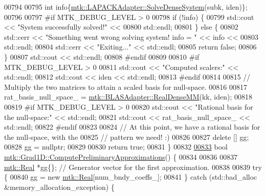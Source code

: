 \begin{DoxyCode}
{{00794 
00795   \textcolor{keywordtype}{int} info\{\hyperlink{classmtk_1_1LAPACKAdapter_a7428bccf74fd4a4af68fb7233846da22}{mtk::LAPACKAdapter::SolveDenseSystem}(subk, iden)\};
00796 
00797 \textcolor{preprocessor}{  #if MTK\_DEBUG\_LEVEL > 0}
00798   \textcolor{keywordflow}{if} (!info) \{
00799     std::cout << \textcolor{stringliteral}{"System successfully solved!"} <<
00800       std::endl;
00801   \} \textcolor{keywordflow}{else} \{
00802     std::cerr << \textcolor{stringliteral}{"Something went wrong solving system! info = "} << info <<
00803       std::endl;
00804     std::cerr << \textcolor{stringliteral}{"Exiting..."} << std::endl;
00805     \textcolor{keywordflow}{return} \textcolor{keyword}{false};
00806   \}
00807   std::cout << std::endl;
00808 \textcolor{preprocessor}{  #endif}
00809 
00810 \textcolor{preprocessor}{  #if MTK\_DEBUG\_LEVEL > 0}
00811   std::cout << \textcolor{stringliteral}{"Computed scalers:"} << std::endl;
00812   std::cout << iden << std::endl;
00813 \textcolor{preprocessor}{  #endif}
00814 
00815   \textcolor{comment}{// Multiply the two matrices to attain a scaled basis for null-space.}
00816 
00817   rat\_basis\_null\_space\_ = \hyperlink{classmtk_1_1BLASAdapter_acebd0e9bfe0bdd609c7fbea98ccfd3b5}{mtk::BLASAdapter::RealDenseMM}(kk, iden);
00818 
00819 \textcolor{preprocessor}{  #if MTK\_DEBUG\_LEVEL > 0}
00820   std::cout << \textcolor{stringliteral}{"Rational basis for the null-space:"} << std::endl;
00821   std::cout << rat\_basis\_null\_space\_ << std::endl;
00822 \textcolor{preprocessor}{  #endif}
00823 
00824   \textcolor{comment}{// At this point, we have a rational basis for the null-space, with the}
00825   \textcolor{comment}{// pattern we need! :)}
00826 
00827   \textcolor{keyword}{delete} [] gg;
00828   gg = \textcolor{keyword}{nullptr};
00829 
00830   \textcolor{keywordflow}{return} \textcolor{keyword}{true};
00831 \}
00832 
\hypertarget{mtk__grad__1d_8cc_source_l00833}{}\hyperlink{classmtk_1_1Grad1D_add4c68a6e78d8b9c2b800b3f96f4757d}{00833} \textcolor{keywordtype}{bool} \hyperlink{classmtk_1_1Grad1D_add4c68a6e78d8b9c2b800b3f96f4757d}{mtk::Grad1D::ComputePreliminaryApproximations}() \{
00834 
00836 
00837   \hyperlink{group__c01-roots_gac080bbbf5cbb5502c9f00405f894857d}{mtk::Real} *gg\{\}; \textcolor{comment}{// Generator vector for the first approximation.}
00838 
00839   \textcolor{keywordflow}{try} \{
00840     gg = \textcolor{keyword}{new} \hyperlink{group__c01-roots_gac080bbbf5cbb5502c9f00405f894857d}{mtk::Real}[num\_bndy\_coeffs\_];
00841   \} \textcolor{keywordflow}{catch} (std::bad\_alloc &memory\_allocation\_exception) \{
}}
\end{DoxyCode}
